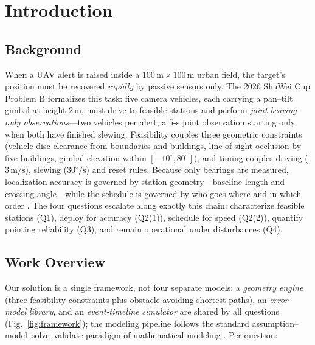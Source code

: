 \section{Introduction}
\subsection{Background}

When a UAV alert is raised inside a $100\,\mathrm{m}\times100\,\mathrm{m}$ urban field,
the target's position must be recovered \emph{rapidly} by passive sensors only. The
2026 ShuWei Cup Problem B formalizes this task: five camera vehicles, each carrying a
pan--tilt gimbal at height $2\,\mathrm{m}$, must drive to feasible stations and perform
\emph{joint bearing-only observations}---two vehicles per alert, a $5$-s joint
observation starting only when both have finished slewing. Feasibility couples three
geometric constraints (vehicle-disc clearance from boundaries and buildings,
line-of-sight occlusion by five buildings, gimbal elevation within $[-10^\circ,80^\circ]$),
and timing couples driving ($3\,\mathrm{m}/\mathrm{s}$), slewing ($30^\circ/\mathrm{s}$)
and reset rules. Because only bearings are measured, localization accuracy is governed by
station geometry---baseline length and crossing angle---while the schedule is governed by
who goes where and in which order
\cite{torrieri1984,gerkey2004}. The four questions escalate along exactly this chain:
characterize feasible stations (Q1), deploy for accuracy (Q2(1)), schedule for speed
(Q2(2)), quantify pointing reliability (Q3), and remain operational under disturbances
(Q4).

\subsection{Work Overview}

Our solution is a single framework, not four separate models: a \emph{geometry engine}
(three feasibility constraints plus obstacle-avoiding shortest paths), an \emph{error
model library}, and an \emph{event-timeline simulator} are shared by all questions
(Fig.~\ref{fig:framework}); the modeling pipeline follows the standard
assumption--model--solve--validate paradigm of mathematical modeling
\cite{jiang2011}. Per question:

